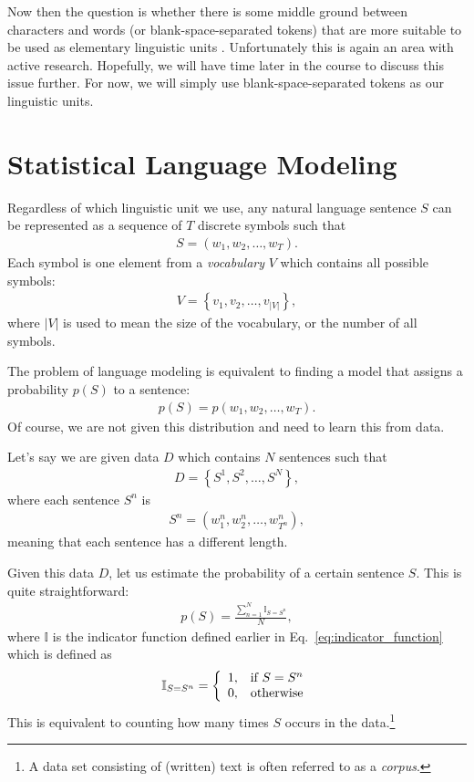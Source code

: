 \documentclass{report}
\newcommand{\II}[0]{\mathbb{I}}
\begin{document}
Now then the question is whether there is some middle ground between characters
and words (or blank-space-separated tokens) that are more suitable to be used as
elementary linguistic units \citep[see, e.g.,][]{sennrich2015neural}.
Unfortunately this is again an area with active research.  Hopefully, we will
have time later in the course to discuss this issue further.  For now, we will
simply use blank-space-separated tokens as our linguistic units.

\section{Statistical Language Modeling}
\label{sec:lm}

Regardless of which linguistic unit we use, any natural language sentence $S$
can be represented as a sequence of $T$ discrete symbols such that
\begin{align*}
    S = (w_1, w_2, \ldots, w_T).
\end{align*}
Each symbol is one element from a {\em vocabulary} $V$ which contains all
possible symbols:
\begin{align*}
    V = \left\{ v_1, v_2, \ldots, v_{|V|}\right\},
\end{align*}
where $|V|$ is used to mean the size of the vocabulary, or the number of all
symbols.

The problem of language modeling is equivalent to finding a model that assigns a
probability $p(S)$ to a sentence:
\begin{align}
    \label{eq:sentence_prob}
    p(S) = p(w_1, w_2, \ldots, w_T).
\end{align}
Of course, we are not given this distribution and need to learn this from data.

Let's say we are given data $D$ which contains $N$ sentences such that
\begin{align*}
    D = \left\{ S^1, S^2, \ldots, S^N \right\},
\end{align*}
where each sentence $S^n$ is 
\begin{align*}
    S^n = (w_1^n, w_2^n, \ldots, w_{T^n}^n),
\end{align*}
meaning that each sentence has a different length.

Given this data $D$, let us estimate the probability of a certain sentence $S$.
This is quite straightforward:
\begin{align}
    \label{eq:sentence_mle}
    p(S) = \frac{\sum_{n=1}^N \II_{S = S^n}}{N},
\end{align}
where $\II$ is the indicator function defined earlier in
Eq.~\eqref{eq:indicator_function} which is defined as
\begin{align*}
    \II_{S=S^n} = \left\{ 
        \begin{array}{c c}
            1, & \text{if }S=S^n \\
            0, & \text{otherwise}
        \end{array}
        \right.
\end{align*}
This is equivalent to counting how many times $S$ occurs in the data.\footnote{
    A data set consisting of (written) text is often referred to as a {\em
    corpus}. 
}
\end{document}
